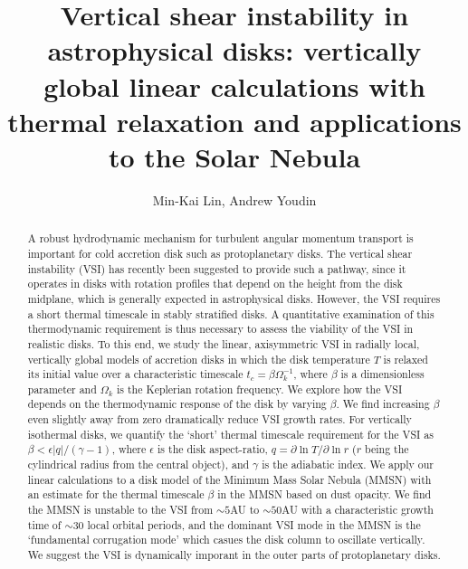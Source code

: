 \documentclass[iop]{emulateapj}
\newcommand{\p}{\partial}
\begin{document}
\title{Vertical shear instability in astrophysical disks: vertically global linear calculations with thermal relaxation and applications to the Solar Nebula} 
\author{Min-Kai Lin, Andrew Youdin}

\begin{abstract}
  A robust hydrodynamic mechanism for turbulent angular momentum
  transport is important for cold accretion disk such as 
  protoplanetary disks. The vertical shear instability (VSI) has 
  recently been suggested to provide such a pathway, since it operates in
  disks with rotation profiles that depend on the height from the 
  disk midplane, which is generally expected in  
  astrophysical disks. However, the VSI requires a short thermal
  timescale in stably stratified disks.  
  A quantitative examination of this thermodynamic 
  requirement is thus necessary to assess the viability of
  the VSI in realistic disks. To this end,  
  we study the linear, axisymmetric VSI in radially local, 
  vertically global models of accretion disks in which the disk  
  temperature $T$ is relaxed its initial value over a characteristic timescale 
  $t_c=\beta\Omega_k^{-1}$, where $\beta$ is a dimensionless parameter 
  and $\Omega_k$ is the Keplerian rotation frequency. We explore how
  the VSI depends on the thermodynamic response of the disk by
  varying $\beta$. We find increasing $\beta$ even slightly away from 
  zero dramatically reduce VSI growth rates. 
  For vertically isothermal disks, we quantify the
  `short' thermal timescale requirement for the VSI as $\beta < \epsilon|q|/(\gamma-1)$, where
  $\epsilon$ is the disk aspect-ratio, $q = \p\ln T/\p\ln r$  ($r$
  being the cylindrical radius from the central object), and 
  $\gamma$ is the adiabatic index. 
  We apply our linear calculations  
  to a disk model of the Minimum Mass Solar Nebula (MMSN) with an  
  estimate for the thermal timescale $\beta$ in the MMSN based on dust
  opacity. We find the MMSN is unstable to the VSI from $\sim 5$AU to $\sim 50$AU with  
  a characteristic growth time of $\sim 30$ local orbital 
  periods, and the dominant VSI mode in the MMSN is the `fundamental
  corrugation mode' which casues the disk column to oscillate
  vertically. We suggest the VSI is dynamically imporant in the outer
  parts of protoplanetary disks. 
\end{abstract}
\end{document}
